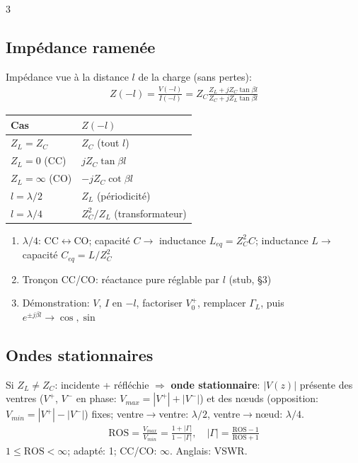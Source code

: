 \documentclass[12pt, a4paper]{article}
\newcommand{\ROS}{\mathrm{ROS}}
\begin{document}
\begin{multicols*}{3}
	\subsection{Impédance ramenée}
	Impédance vue à la distance $l$ de la charge (sans pertes):
	\begin{gather*}
		Z(-l)=\frac{V(-l)}{I(-l)}=Z_C\frac{Z_L+jZ_C\tan\beta l}{Z_C+jZ_L\tan\beta l}
	\end{gather*}
	\begin{tabular}{|l|l|}
		\hline
		\textbf{Cas}             & $Z(-l)$                    \\
		\hline
		$Z_L=Z_C$                & $Z_C$ (tout $l$)           \\
		$Z_L=0$ (CC)             & $jZ_C\tan\beta l$          \\
		$Z_L=\infty$ (CO)        & $-jZ_C\cot\beta l$         \\
		$l=\lambda/2$            & $Z_L$ (périodicité)        \\
		$l=\lambda/4$            & $Z_C^2/Z_L$ (transformateur) \\
		\hline
	\end{tabular}
	\begin{enumerate}[\roman*.]
		\item $\lambda/4$: CC$\leftrightarrow$CO; capacité $C\to$ inductance $L_{eq}=Z_C^2C$; inductance $L\to$ capacité $C_{eq}=L/Z_C^2$
		\item Tronçon CC/CO: réactance pure réglable par $l$ (stub, §3)
		\item Démonstration: $V$, $I$ en $-l$, factoriser $V_0^+$, remplacer $\Gamma_L$, puis $e^{\pm j\beta l}\to\cos,\sin$
	\end{enumerate}

	\subsection{Ondes stationnaires}
	Si $Z_L\neq Z_C$: incidente + réfléchie $\Rightarrow$ \textbf{onde stationnaire}: $|V(z)|$ présente des ventres ($V^+$, $V^-$ en phase: $V_{max}=|V^+|+|V^-|$) et des nœuds (opposition: $V_{min}=|V^+|-|V^-|$) fixes; ventre$\to$ventre: $\lambda/2$, ventre$\to$nœud: $\lambda/4$.
	\begin{gather*}
		\ROS=\frac{V_{max}}{V_{min}}=\frac{1+|\Gamma|}{1-|\Gamma|},\quad|\Gamma|=\frac{\ROS-1}{\ROS+1}
	\end{gather*}
	$1\leq\ROS<\infty$; adapté: 1; CC/CO: $\infty$. Anglais: VSWR.


\end{multicols*}
\end{document}
